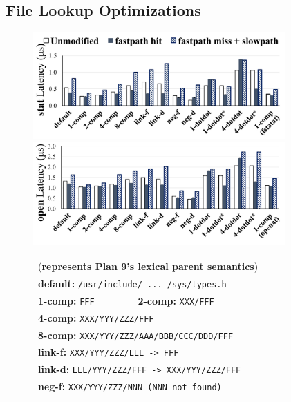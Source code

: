 
\subsection{File Lookup Optimizations}

\begin{figure}
\scriptsize
\centering
\begin{minipage}{4in}
\centering
\includegraphics[width=3.8in]{dcache/plots/lm_stat.pdf} \\
\includegraphics[width=3.8in]{dcache/plots/lm_open.pdf} \\
\end{minipage}
\begin{minipage}{2.4in}
\begin{tabular}{ll}
\multicolumn{2}{l}{({\bf * represents Plan 9's lexical parent semantics})} \\
\multicolumn{2}{l}{{\bf default:} \tt /usr/include/ ... /sys/types.h} \\
{{\bf 1-comp:} \tt FFF} &
{{\bf 2-comp:} \tt XXX/FFF} \\
\multicolumn{2}{l}{{\bf 4-comp:} \tt XXX/YYY/ZZZ/FFF} \\
\multicolumn{2}{l}{{\bf 8-comp:} \tt XXX/YYY/ZZZ/AAA/BBB/CCC/DDD/FFF} \\
\multicolumn{2}{l}{{\bf link-f:} \tt XXX/YYY/ZZZ/LLL -> FFF} \\
\multicolumn{2}{l}{{\bf link-d:} \tt LLL/YYY/ZZZ/FFF -> XXX/YYY/ZZZ/FFF} \\
\multicolumn{2}{l}{{\bf neg-f:} \tt XXX/YYY/ZZZ/NNN (NNN not found)} \\

\end{tabular}
\end{minipage}
\end{figure}
